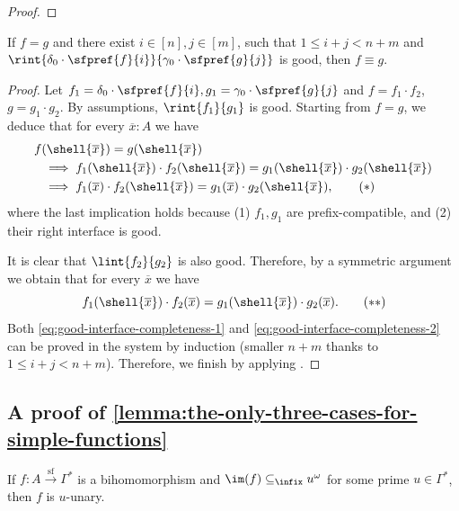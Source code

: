 \begin{proof}
\end{proof}

\begin{claim}\label{claim:progress_for_good_interface}
    If $f = g$ and there exist $i \in [n], j \in [m]$, such that $1 \leq i + j < n+m$ and $\rint{\delta_0 \cdot \sfpref{f}{i}}{\gamma_0 \cdot \sfpref{g}{j}}$ is good, then $f \equiv g$.
\end{claim}

\begin{proof}
    Let $f_1 = \delta_0 \cdot \sfpref{f}{i}, g_1 = \gamma_0 \cdot \sfpref{g}{j}$ and $f = f_1 \cdot f_2$, $g = g_1 \cdot g_2$. By assumptions, $\rint{f_1}{g_1}$ is good. Starting from $f = g$, we deduce that for every $\overline x : A$ we have
    \begin{align*}
        f&(\shell{\overline x}) = g(\shell{\overline x}) \\ 
        &\implies f_1(\shell{\overline x}) \cdot f_2(\shell{\overline x}) = g_1(\shell{\overline x}) \cdot g_2(\shell{\overline x}) \\ 
        &\implies f_1(\overline x) \cdot f_2(\shell{\overline{x}}) = g_1(\overline x) \cdot g_2(\shell{\overline x}), \tag{$*$}\label{eq:good-interface-completeness-1}
    \end{align*}
    where the last implication holds because (1) $f_1,g_1$ are prefix-compatible, and (2) their right interface is good.

    It is clear that $\lint{f_2}{g_2}$ is also good. Therefore, by a symmetric argument we obtain that for every $\overline x$ we have
    \[
        f_1(\shell{\overline x}) \cdot f_2(\overline x) = g_1(\shell{\overline x}) \cdot g_2(\overline x). \tag{$**$}\label{eq:good-interface-completeness-2}
    \]
    Both \eqref{eq:good-interface-completeness-1} and \eqref{eq:good-interface-completeness-2} can be proved in the system by induction (smaller $n + m$ thanks to $1 \leq i+j < n +m$). Therefore, we finish by applying .
\end{proof}

\subsection{A proof of \cref{lemma:the-only-three-cases-for-simple-functions}}

\begin{lemma}\label{lem:if-bihom-has-unary-image-then-its-unary}
    If $f : A \xrightarrow{\mathrm{sf}} \Gamma^*$ is a bihomomorphism and $\im(f) \subseteq_\infix u^\omega$ for some prime $u \in \Gamma^*$, then $f$ is $u$-unary.
\end{lemma}


